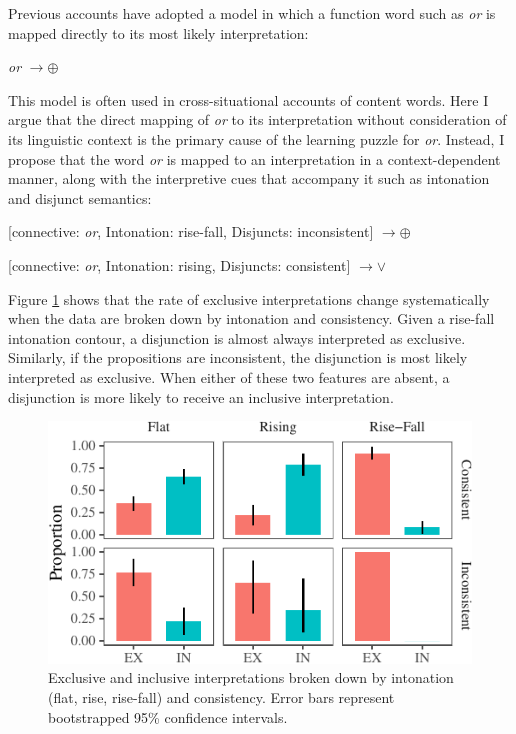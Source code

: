 \documentclass[,man,floatsintext]{apa6}
\begin{document}
Previous accounts have adopted a model in which a function word such as \emph{or} is mapped directly to its most likely interpretation:

\emph{or} \(\rightarrow \oplus\)

This model is often used in cross-situational accounts of content words. Here I argue that the direct mapping of \emph{or} to its interpretation without consideration of its linguistic context is the primary cause of the learning puzzle for \emph{or}. Instead, I propose that the word \emph{or} is mapped to an interpretation in a context-dependent manner, along with the interpretive cues that accompany it such as intonation and disjunct semantics:

{[}connective: \emph{or}, Intonation: rise-fall, Disjuncts: inconsistent{]} \(\rightarrow \oplus\)

{[}connective: \emph{or}, Intonation: rising, Disjuncts: consistent{]} \(\rightarrow \lor\)

Figure \ref{fig:interpretationByIntonationAndConsistency} shows that the rate of exclusive interpretations change systematically when the data are broken down by intonation and consistency. Given a rise-fall intonation contour, a disjunction is almost always interpreted as exclusive. Similarly, if the propositions are inconsistent, the disjunction is most likely interpreted as exclusive. When either of these two features are absent, a disjunction is more likely to receive an inclusive interpretation.

\begin{figure}[tb]

{\centering \includegraphics{figs/interpretationByIntonationAndConsistency-1} 

}

\caption{Exclusive and inclusive interpretations broken down by intonation (flat, rise, rise-fall) and consistency. Error bars represent bootstrapped 95\% confidence intervals.}\label{fig:interpretationByIntonationAndConsistency}
\end{figure}
\end{document}
